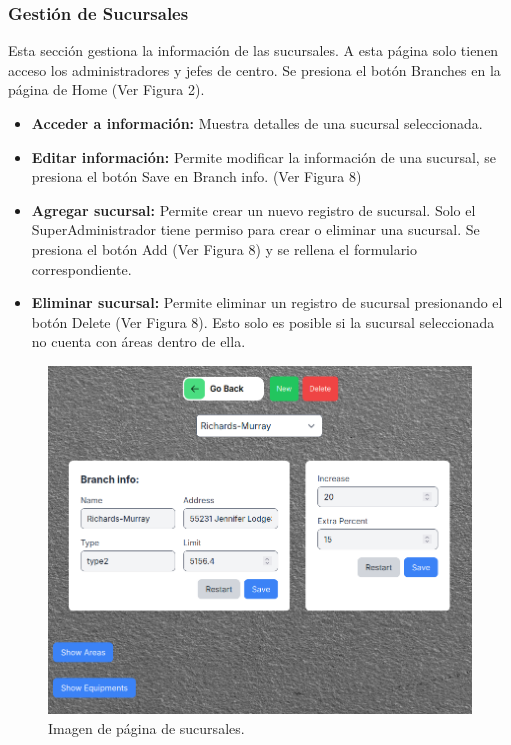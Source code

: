 \documentclass{article}
\begin{document}
\subsubsection{Gestión de Sucursales}
Esta sección gestiona la información de las sucursales. A esta página solo tienen acceso los administradores y jefes de centro. Se presiona el botón Branches en la página de Home (Ver Figura 2).

\begin{itemize}
    \item \textbf{Acceder a información:} Muestra detalles de una sucursal seleccionada. 
    \item \textbf{Editar información:} Permite modificar la información de una sucursal, se presiona el botón Save en Branch info. (Ver Figura 8)
    \item \textbf{Agregar sucursal:} Permite crear un nuevo registro de sucursal. Solo el SuperAdministrador tiene permiso para crear o eliminar una sucursal. 
    Se presiona el botón Add (Ver Figura 8) y se rellena el formulario correspondiente.
    \item \textbf{Eliminar sucursal:} Permite eliminar un registro de sucursal presionando el botón Delete (Ver Figura 8). Esto solo es posible si la sucursal seleccionada no cuenta con áreas dentro de ella.
\end{itemize}

\begin{figure}[h!]
    \centering
    \includegraphics[width= 12cm]{branch_page.png}
    \caption{Imagen de página de sucursales.}
\end{figure}
\end{document}
